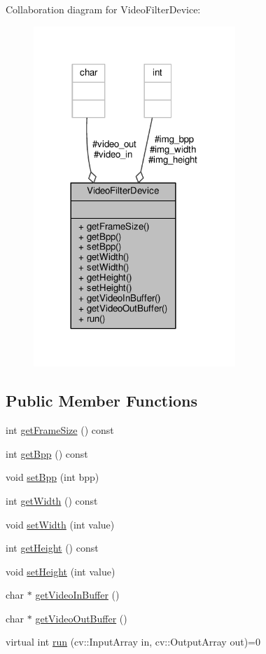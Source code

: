 Collaboration diagram for Video\+Filter\+Device\+:
\nopagebreak
\begin{figure}[H]
\begin{center}
\leavevmode
\includegraphics[width=216pt]{classVideoFilterDevice__coll__graph}
\end{center}
\end{figure}
\subsection*{Public Member Functions}
\begin{DoxyCompactItemize}
\item 
int \hyperlink{classVideoFilterDevice_a58e42daac01703e19465afd151a5e363}{get\+Frame\+Size} () const 
\item 
int \hyperlink{classVideoFilterDevice_a49cae600ea3be005491f0578e7c63863}{get\+Bpp} () const 
\item 
void \hyperlink{classVideoFilterDevice_a61c87ce1026569c72eab67ec1cd1140d}{set\+Bpp} (int bpp)
\item 
int \hyperlink{classVideoFilterDevice_a8dd4132ce498d59b867d661fc86d250e}{get\+Width} () const 
\item 
void \hyperlink{classVideoFilterDevice_a15f788f1d03a0fa1b44c594f4e0a3c48}{set\+Width} (int value)
\item 
int \hyperlink{classVideoFilterDevice_ac8ca39177708cc8d1069aa20744fbbeb}{get\+Height} () const 
\item 
void \hyperlink{classVideoFilterDevice_a1c054f9e2254c17b017e81c858a5e6be}{set\+Height} (int value)
\item 
char $\ast$ \hyperlink{classVideoFilterDevice_ac6828e9cb7f42934adbb6b278a3219c0}{get\+Video\+In\+Buffer} ()
\item 
char $\ast$ \hyperlink{classVideoFilterDevice_accdf0cd7c431881df4a7e4c83635674f}{get\+Video\+Out\+Buffer} ()
\item 
virtual int \hyperlink{classVideoFilterDevice_a8c0e8a16b0574b95ead26f9907073c8d}{run} (cv\+::\+Input\+Array in, cv\+::\+Output\+Array out)=0
\end{DoxyCompactItemize}
